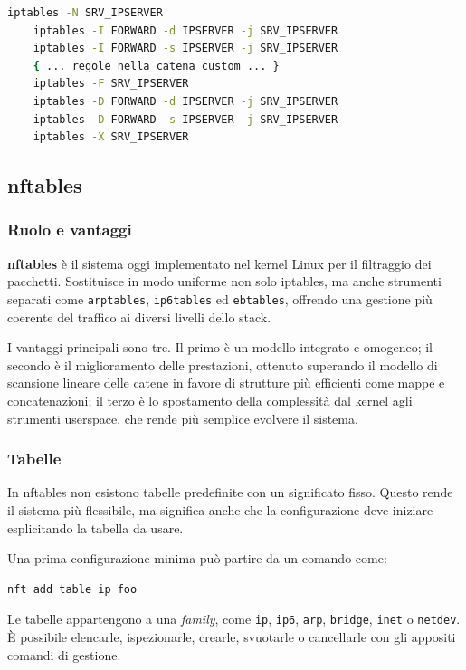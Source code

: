 \documentclass[12pt, a4paper]{report}
\begin{document}
\begin{lstlisting}[language=bash]
	iptables -N SRV_IPSERVER
	iptables -I FORWARD -d IPSERVER -j SRV_IPSERVER
	iptables -I FORWARD -s IPSERVER -j SRV_IPSERVER
	{ ... regole nella catena custom ... }
	iptables -F SRV_IPSERVER
	iptables -D FORWARD -d IPSERVER -j SRV_IPSERVER
	iptables -D FORWARD -s IPSERVER -j SRV_IPSERVER
	iptables -X SRV_IPSERVER
\end{lstlisting}

\subsection{nftables}

\subsubsection{Ruolo e vantaggi}
\textbf{nftables} è il sistema oggi implementato nel kernel Linux per il filtraggio dei pacchetti. Sostituisce in modo uniforme non solo iptables, ma anche strumenti separati come \texttt{arptables}, \texttt{ip6tables} ed \texttt{ebtables}, offrendo una gestione più coerente del traffico ai diversi livelli dello stack.

I vantaggi principali sono tre. Il primo è un modello integrato e omogeneo; il secondo è il miglioramento delle prestazioni, ottenuto superando il modello di scansione lineare delle catene in favore di strutture più efficienti come mappe e concatenazioni; il terzo è lo spostamento della complessità dal kernel agli strumenti userspace, che rende più semplice evolvere il sistema.

\subsubsection{Tabelle}
In nftables non esistono tabelle predefinite con un significato fisso. Questo rende il sistema più flessibile, ma significa anche che la configurazione deve iniziare esplicitando la tabella da usare.

Una prima configurazione minima può partire da un comando come:
\begin{lstlisting}[language=bash]
	nft add table ip foo
\end{lstlisting}

Le tabelle appartengono a una \textit{family}, come \texttt{ip}, \texttt{ip6}, \texttt{arp}, \texttt{bridge}, \texttt{inet} o \texttt{netdev}. È possibile elencarle, ispezionarle, crearle, svuotarle o cancellarle con gli appositi comandi di gestione.
\end{document}
